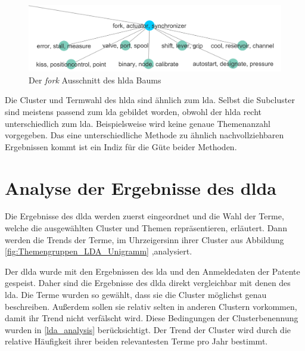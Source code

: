 \begin{figure}[htpb]
	\centering
	\includegraphics[width=\textwidth,keepaspectratio=true]{img/hldaFork.png}
	\caption{
		Der \emph{fork} Ausschnitt des \gls{hlda} Baums
	}
	\label{fig:hlda_fork}
\end{figure}

Die Cluster und Termwahl des \gls{hlda} sind ähnlich zum \gls{lda}. Selbst die Subcluster sind meistens passend zum \gls{lda} gebildet worden, obwohl der \gls{hlda} recht unterschiedlich zum \gls{lda}. Beispielsweise wird keine genaue Themenanzahl vorgegeben. Das eine unterschiedliche Methode zu ähnlich nachvollziehbaren Ergebnissen kommt ist ein Indiz für die Güte beider Methoden.


\section{Analyse der Ergebnisse des \gls{dlda}}

Die Ergebnisse des \gls{dlda} werden zuerst eingeordnet und die Wahl der Terme, welche die ausgewählten Cluster und Themen repräsentieren, erläutert. Dann werden die Trends der Terme, im Uhrzeigersinn ihrer Cluster aus Abbildung \ref{fig:Themengruppen_LDA_Unigramm} ,analysiert.


Der \gls{dlda} wurde mit den Ergebnissen des \gls{lda} und den Anmeldedaten der Patente gespeist. Daher sind die Ergebnisse des \gls{dlda} direkt vergleichbar mit denen des \gls{lda}. Die Terme wurden so gewählt, dass sie die Cluster möglichst genau beschreiben. Außerdem sollen sie relativ selten in anderen Clustern vorkommen, damit ihr Trend nicht verfälscht wird. Diese Bedingungen der Clusterbenennung wurden in \ref{lda_analysis} berücksichtigt. Der Trend der Cluster wird durch die relative Häufigkeit ihrer beiden relevantesten Terme pro Jahr bestimmt.


